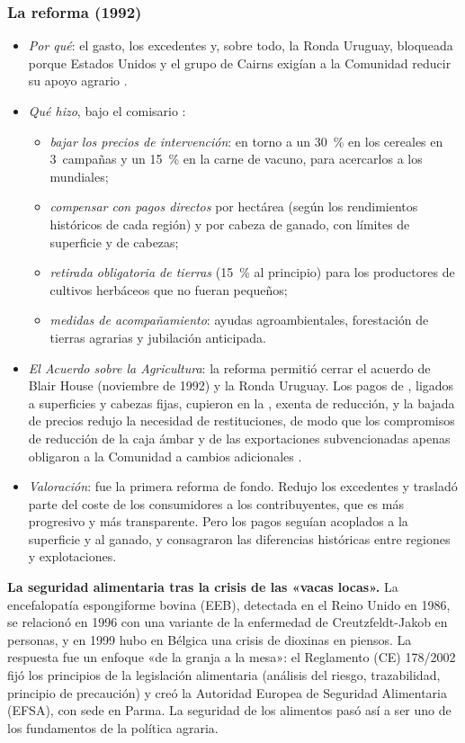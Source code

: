 \documentclass[11pt]{article}
\begin{document}
\subsubsection{La reforma  (1992)}\label{sec:macsharry}

\begin{itemize}
\item \emph{Por qué}: el gasto, los excedentes y, sobre todo, la Ronda Uruguay, bloqueada porque Estados Unidos y el grupo de Cairns exigían a la Comunidad reducir su apoyo agrario .
\item \emph{Qué hizo}, bajo el comisario :
  \begin{itemize}
  \item \emph{bajar los precios de intervención}: en torno a un 30~\% en los cereales en 3~campañas y un 15~\% en la carne de vacuno, para acercarlos a los mundiales;
  \item \emph{compensar con pagos directos} por hectárea (según los rendimientos históricos de cada región) y por cabeza de ganado, con límites de superficie y de cabezas;
  \item \emph{retirada obligatoria de tierras} (15~\% al principio) para los productores de cultivos herbáceos que no fueran pequeños;
  \item \emph{medidas de acompañamiento}: ayudas agroambientales, forestación de tierras agrarias y jubilación anticipada.
  \end{itemize}
\item \emph{El Acuerdo sobre la Agricultura}: la reforma permitió cerrar el acuerdo de Blair House (noviembre de 1992) y la Ronda Uruguay. Los pagos de , ligados a superficies y cabezas fijas, cupieron en la , exenta de reducción, y la bajada de precios redujo la necesidad de restituciones, de modo que los compromisos de reducción de la caja ámbar y de las exportaciones subvencionadas apenas obligaron a la Comunidad a cambios adicionales .
\item \emph{Valoración}: fue la primera reforma de fondo. Redujo los excedentes y trasladó parte del coste de los consumidores a los contribuyentes, que es más progresivo y más transparente. Pero los pagos seguían acoplados a la superficie y al ganado, y consagraron las diferencias históricas entre regiones y explotaciones.
\end{itemize}

\begin{anotaciones}
\textbf{La seguridad alimentaria tras la crisis de las «vacas locas».} La encefalopatía espongiforme bovina (EEB), detectada en el Reino Unido en 1986, se relacionó en 1996 con una variante de la enfermedad de Creutzfeldt-Jakob en personas, y en 1999 hubo en Bélgica una crisis de dioxinas en piensos. La respuesta fue un enfoque «de la granja a la mesa»: el Reglamento (CE) 178/2002 fijó los principios de la legislación alimentaria (análisis del riesgo, trazabilidad, principio de precaución) y creó la Autoridad Europea de Seguridad Alimentaria (EFSA), con sede en Parma. La seguridad de los alimentos pasó así a ser uno de los fundamentos de la política agraria.
\end{anotaciones}
\end{document}
